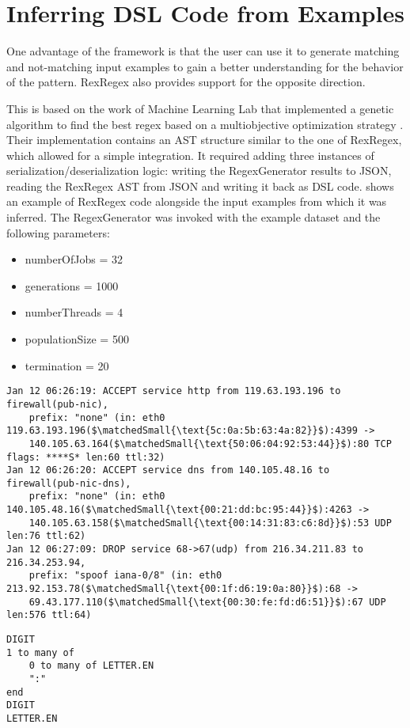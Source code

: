 \section{Inferring DSL Code from Examples} \label{sec:inferenceOfRexRegex}

One advantage of the \utgast{} framework is that the user can use it to generate matching and not-matching input examples to gain a better understanding for the behavior of the pattern. RexRegex also provides support for the opposite direction.

This is based on the work of Machine Learning Lab that implemented a genetic algorithm to find the best regex based on a multiobjective optimization strategy \cite{bartoli2016inference}\cite{bartoli2016can}\cite{bartoli2015evolutionary}. Their implementation contains an AST structure similar to the one of RexRegex, which allowed for a simple integration. It required adding three instances of serialization/deserialization logic: writing the RegexGenerator results to JSON, reading the RexRegex AST from JSON and writing it back as DSL code.
 shows an example of RexRegex code alongside the input examples from which it was inferred. The RegexGenerator was invoked with the example dataset and the following parameters:

\begin{itemize}
    \setlength\itemsep{0em}
    \item numberOfJobs = 32
    \item generations = 1000
    \item numberThreads = 4
    \item populationSize = 500
    \item termination = 20
\end{itemize}

\FloatBarrier

\begin{listingBox}[float=htb,title={Inferred RexRegex code from examples},label=code:inferenceOfRexRegex]
    \begin{lstlisting}[basicstyle=\scriptsize,mathescape=true]
Jan 12 06:26:19: ACCEPT service http from 119.63.193.196 to firewall(pub-nic), 
    prefix: "none" (in: eth0 119.63.193.196($\matchedSmall{\text{5c:0a:5b:63:4a:82}}$):4399 -> 
    140.105.63.164($\matchedSmall{\text{50:06:04:92:53:44}}$):80 TCP flags: ****S* len:60 ttl:32)
Jan 12 06:26:20: ACCEPT service dns from 140.105.48.16 to firewall(pub-nic-dns), 
    prefix: "none" (in: eth0 140.105.48.16($\matchedSmall{\text{00:21:dd:bc:95:44}}$):4263 -> 
    140.105.63.158($\matchedSmall{\text{00:14:31:83:c6:8d}}$):53 UDP len:76 ttl:62)
Jan 12 06:27:09: DROP service 68->67(udp) from 216.34.211.83 to 216.34.253.94, 
    prefix: "spoof iana-0/8" (in: eth0 213.92.153.78($\matchedSmall{\text{00:1f:d6:19:0a:80}}$):68 -> 
    69.43.177.110($\matchedSmall{\text{00:30:fe:fd:d6:51}}$):67 UDP len:576 ttl:64)
    \end{lstlisting}
    \tcblower
    \begin{lstlisting}[style=rexregex]
DIGIT
1 to many of
    0 to many of LETTER.EN
    ":"
end
DIGIT
LETTER.EN
    \end{lstlisting}
\end{listingBox}


